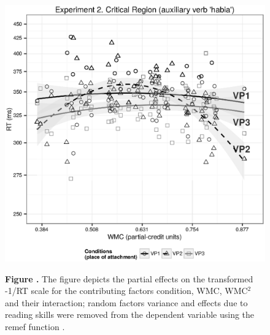 \documentclass{frontiersSCNS}\usepackage{knitr}
\begin{document}
\begin{figure}
\begin{center}
\includegraphics{figure/graphics-experiment2-auxV-graph.eps} 
\end{center}
\textbf{\label{fig:experiment2-auxV-graph} Figure .}{ The figure depicts the  partial effects on the transformed -1/RT scale for the contributing factors condition, WMC, WMC$^2$ and their interaction;  random factors variance and effects due to reading skills were removed from the dependent variable using the remef function \citep{HohensteinReinhold2013}. }
\end{figure}



  
\end{document}
